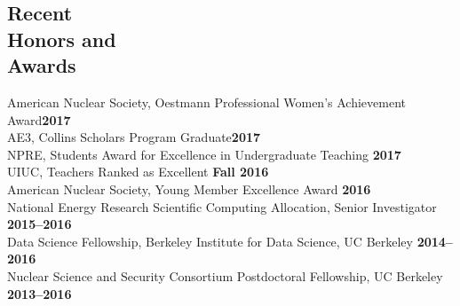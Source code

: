 \documentclass[margin,line]{resume}
\begin{document}
\begin{resume}
    \section{\mysidestyle Recent\\Honors and\\Awards}
                American Nuclear Society, Oestmann Professional Women's Achievement Award\hfill \textbf{2017}\vspace{.5mm}\\%
                AE3, Collins Scholars Program Graduate\hfill \textbf{2017}\vspace{.5mm}\\%
                NPRE, Students Award for Excellence in Undergraduate Teaching \hfill \textbf{2017}\vspace{.5mm}\\%
                UIUC, Teachers Ranked as Excellent \hfill \textbf{Fall 2016}\vspace{.5mm}\\%
                American Nuclear Society, Young Member Excellence Award                         \hfill \textbf{2016}\vspace{.5mm}\\%
                National Energy Research Scientific Computing Allocation, Senior Investigator     \hfill \textbf{2015--2016}\vspace{.5mm}\\%
                Data Science Fellowship, Berkeley Institute for Data Science, UC Berkeley     \hfill \textbf{2014--2016}\vspace{.5mm}\\%
                Nuclear Science and Security Consortium Postdoctoral Fellowship, UC Berkeley  \hfill \textbf{2013--2016}\vspace{.5mm}\\%

\end{resume}
\end{document}
